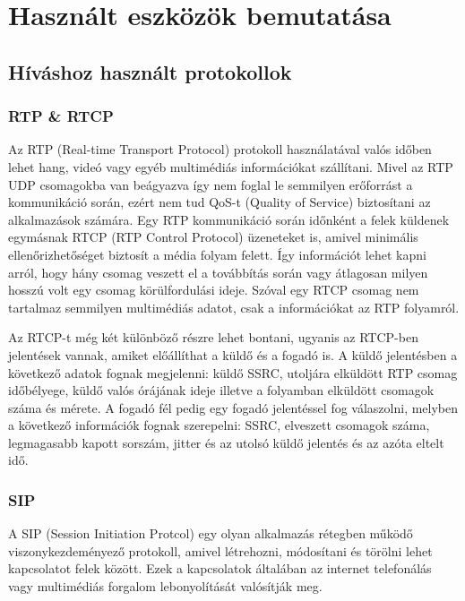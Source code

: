 \chapter{Használt eszközök bemutatása}

\section{Híváshoz használt protokollok}

\subsection{RTP \& RTCP}

Az RTP (Real-time Transport Protocol) protokoll használatával valós időben lehet
hang, videó vagy egyéb multimédiás információkat szállítani. Mivel az RTP UDP
csomagokba van beágyazva így nem foglal le semmilyen erőforrást a kommunikáció
során, ezért nem tud QoS-t (Quality of Service) biztosítani az alkalmazások számára.
Egy RTP kommunikáció során időnként a felek küldenek egymásnak RTCP (RTP Control
Protocol) üzeneteket is, amivel minimális ellenőrizhetőséget biztosít a média 
folyam felett. Így információt lehet kapni arról, hogy hány csomag veszett el
a továbbítás során vagy átlagosan milyen hosszú volt egy csomag körülfordulási
ideje. Szóval egy RTCP csomag nem tartalmaz semmilyen multimédiás adatot, csak 
a információkat az RTP folyamról. 

Az RTCP-t még két különböző részre lehet bontani, ugyanis az RTCP-ben jelentések 
vannak, amiket előállíthat a küldő és a fogadó is. A küldő jelentésben a következő
adatok fognak megjelenni: küldő SSRC, utoljára elküldött RTP csomag időbélyege, 
küldő valós órájának ideje illetve a folyamban elküldött csomagok száma és 
mérete. A fogadó fél pedig egy fogadó jelentéssel fog válaszolni, melyben a következő
információk fognak szerepelni: SSRC, elveszett csomagok száma, legmagasabb kapott
sorszám, jitter és az utolsó küldő jelentés és az azóta eltelt idő. 

\subsection{SIP}

A SIP (Session Initiation Protcol) egy olyan alkalmazás rétegben működő viszonykezdeményező
protokoll, amivel létrehozni, módosítani és törölni lehet kapcsolatot felek között. 
Ezek a kapcsolatok általában az internet telefonálás vagy multimédiás forgalom
lebonyolítását valósítják meg. 

